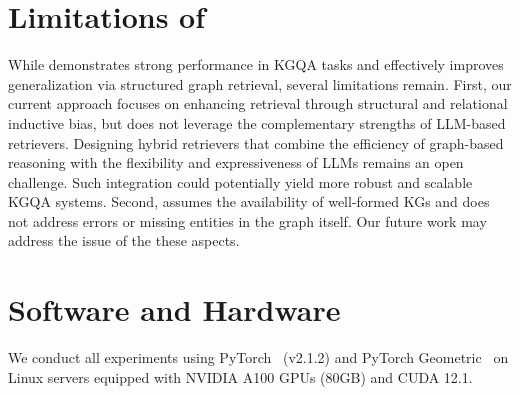 \section{Limitations of \proj}
While \proj{} demonstrates strong performance in KGQA tasks and effectively improves generalization via structured graph retrieval, several limitations remain. 
First, our current approach focuses on enhancing retrieval through structural and relational inductive bias, but does not leverage the complementary strengths of LLM-based retrievers. Designing hybrid retrievers that combine the efficiency of graph-based reasoning with the flexibility and expressiveness of LLMs remains an open challenge. Such integration could potentially yield more robust and scalable KGQA systems.
Second, \proj{} assumes the availability of well-formed KGs and does not address errors or missing entities in the graph itself. Our future work may address the issue of the these aspects.

\section{Software and Hardware}
We conduct all experiments using PyTorch~\cite{paszke2019pytorchimperativestylehighperformance} (v2.1.2) and PyTorch Geometric~\cite{fey2019fast} on Linux servers equipped with NVIDIA A100 GPUs (80GB) and CUDA 12.1.
